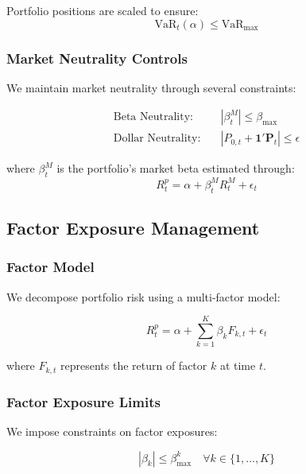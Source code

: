 Portfolio positions are scaled to ensure:
\begin{equation}
    \text{VaR}_t(\alpha) \leq \text{VaR}_{\text{max}}
\end{equation}

\subsubsection{Market Neutrality Controls}
We maintain market neutrality through several constraints:

\begin{equation}
\begin{aligned}
    \text{Beta Neutrality:} \quad & |\beta_t^M| \leq \beta_{\text{max}} \\
    \text{Dollar Neutrality:} \quad & |P_{0,t} + \mathbf{1}'\mathbf{P}_t| \leq \epsilon
\end{aligned}
\end{equation}

where $\beta_t^M$ is the portfolio's market beta estimated through:
\begin{equation}
    R_t^p = \alpha + \beta_t^M R_t^M + \epsilon_t
\end{equation}

\subsection{Factor Exposure Management}

\subsubsection{Factor Model}
We decompose portfolio risk using a multi-factor model:

\begin{equation}
    R_t^p = \alpha + \sum_{k=1}^K \beta_k F_{k,t} + \epsilon_t
\end{equation}

where $F_{k,t}$ represents the return of factor $k$ at time $t$.

\subsubsection{Factor Exposure Limits}
We impose constraints on factor exposures:

\begin{equation}
    |\beta_k| \leq \beta_{\text{max}}^k \quad \forall k \in \{1,\ldots,K\}
\end{equation}

